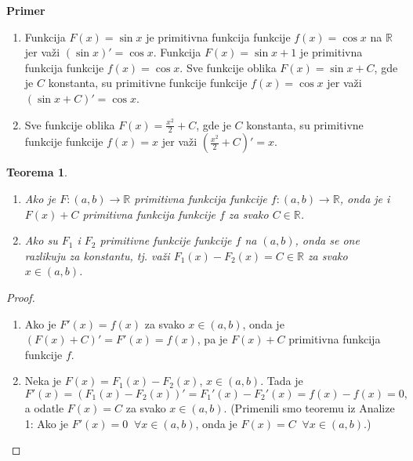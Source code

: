 \documentclass[a4paper,12pt,twoside]{report}
\newtheorem{theorem}{Teorema}[section]
\numberwithin{algorithm}{section}
\begin{document}
\noindent \textbf{Primer} \begin{enumerate}[label=\alph*)]
    \item Funkcija \(F(x) = \sin x\) je primitivna funkcija funkcije \(f(x) = \cos x\) na \(\mathbb{R}\) jer važi \((\sin x)' = \cos x\).
    Funkcija \(F(x) = \sin x + 1\) je primitivna funkcija funkcije \(f(x) = \cos x\).
    Sve funkcije oblika \(F(x) = \sin x + C\), gde je \(C\) konstanta, su primitivne funkcije funkcije \(f(x) = \cos x\) jer važi \((\sin x + C)' = \cos x\).
    
    \item Sve funkcije oblika \(F(x) = \frac{x^2}{2} + C\), gde je \(C\) konstanta, su primitivne funkcije funkcije \(f(x) = x\) jer važi \((\frac{x^2}{2} + C)' = x\).
    
\end{enumerate}
\begin{theorem}\
    \begin{enumerate}[label=\alph*)]
        \item Ako je $F:(a, b) \to \mathbb{R}$ primitivna funkcija funkcije $f:(a, b) \to \mathbb{R}$, onda je i $F(x) + C$ primitivna
    funkcija funkcije $f$ za svako $C \in \mathbb{R}$.  
        \item Ako su $F_1$ i $F_2$ primitivne funkcije funkcije $f$ na $(a, b)$, onda se one razlikuju za konstantu, tj. važi $F_1(x) - F_2(x) = C \in \mathbb{R}$ za svako $x \in (a, b)$.
    \end{enumerate}
    
\end{theorem}

\begin{proof}
    \begin{enumerate}[label=\alph*)]
        \item Ako je \(F'(x) = f(x)\) za svako \(x \in (a, b)\), onda je 
        \((F(x) + C)' = F'(x) = f(x)\), pa je \(F(x) + C\) primitivna funkcija funkcije \(f\).
        
        \item Neka je \(F(x) = F_1(x) - F_2(x)\), \(x \in (a, b)\). Tada je
        \[
            F'(x) = (F_1(x) - F_2(x))' = F_1'(x) - F_2'(x) = f(x) - f(x) = 0,
        \]
        a odatle \(F(x) = C\) za svako \(x \in (a, b)\). (Primenili smo teoremu iz Analize 1: Ako je \(F'(x) = 0 \;\; \forall x \in (a, b)\), onda je \(F(x) = C \;\; \forall x \in (a, b)\).)
    \end{enumerate}
\end{proof}
\end{document}
